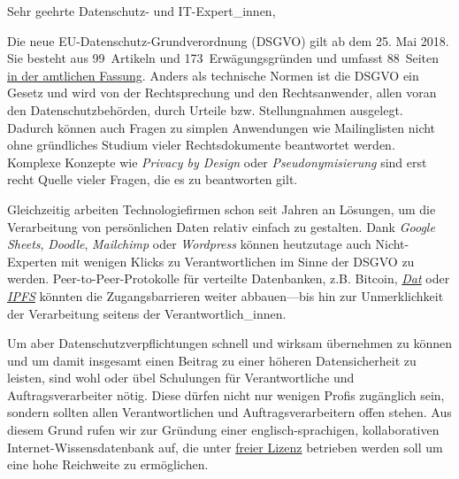 \documentclass{scrlttr2}
\begin{document}



\begin{letter}{}
\opening{Sehr geehrte Datenschutz- und IT-Expert\_innen,}

Die neue EU-Datenschutz-Grundverordnung (DSGVO) gilt ab dem 25. Mai
2018. Sie besteht aus 99~Artikeln und 173~Erwägungsgründen und umfasst
88~Seiten
\href{http://eur-lex.europa.eu/legal-content/EN/TXT/?uri=uriserv:OJ.L_.2016.119.01.0001.01.ENG}{in
der amtlichen Fassung}. Anders als technische Normen ist die DSGVO ein
Gesetz und wird von der Rechtsprechung und den Rechtsanwender, allen
voran den Datenschutzbehörden, durch Urteile bzw. Stellungnahmen
ausgelegt. Dadurch können auch Fragen zu simplen Anwendungen wie
Mailinglisten nicht ohne gründliches Studium vieler Rechtsdokumente
beantwortet werden. Komplexe Konzepte wie \emph{Privacy by Design} oder
\emph{Pseudonymisierung} sind erst recht Quelle vieler Fragen, die es zu
beantworten gilt.

Gleichzeitig arbeiten Technologiefirmen schon seit Jahren an Lösungen,
um die Verarbeitung von persönlichen Daten relativ einfach zu gestalten.
Dank \emph{Google Sheets}, \emph{Doodle}, \emph{Mailchimp} oder
\emph{Wordpress} können heutzutage auch Nicht-Experten mit wenigen
Klicks zu Verantwortlichen im Sinne der DSGVO zu werden.
Peer-to-Peer-Protokolle für verteilte Datenbanken, z.B. Bitcoin,
\emph{\href{https://datproject.org/}{Dat}} oder
\emph{\href{https://ipfs.io/}{IPFS}} könnten die Zugangsbarrieren weiter
abbauen---bis hin zur Unmerklichkeit der Verarbeitung seitens der
Verantwortlich\_innen.

Um aber Datenschutzverpflichtungen schnell und wirksam übernehmen zu
können und um damit insgesamt einen Beitrag zu einer höheren
Datensicherheit zu leisten, sind wohl oder übel Schulungen für
Verantwortliche und Auftragsverarbeiter nötig. Diese dürfen nicht nur
wenigen Profis zugänglich sein, sondern sollten allen Verantwortlichen
und Auftragsverarbeitern offen stehen. Aus diesem Grund rufen wir zur
Gründung einer englisch-sprachigen, kollaborativen
Internet-Wissensdatenbank auf, die unter
\href{https://creativecommons.org/}{freier Lizenz} betrieben werden soll
um eine hohe Reichweite zu ermöglichen.


\end{letter}
\end{document}
